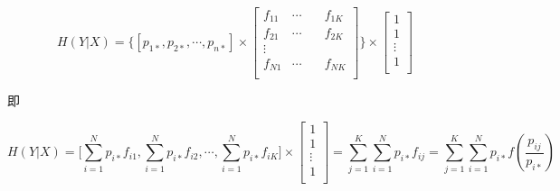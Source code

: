 \begin{remark}
    \begin{equation*}
        H(Y|X) = \Bigg\{ [p_{1*}, p_{2*},\cdots, p_{n*}] \times
        \left[
            \begin{aligned}
                f_{11} & \cdots & \quad f_{1K} \\
                f_{21} & \cdots & \quad f_{2K} \\
                \vdots                         \\
                f_{N1} & \cdots & \quad f_{NK} \\
            \end{aligned}
            \right] \Bigg\} \times
        \left[
            \begin{aligned}
                1      \\
                1      \\
                \vdots \\
                1      \\
            \end{aligned}
            \right]
    \end{equation*}

    即

    \begin{equation*}
        H(Y|X) = \Big[\sum_{i=1}^Np_{i*}f_{i1}, \sum_{i=1}^Np_{i*}f_{i2}, \cdots, \sum_{i=1}^Np_{i*}f_{iK}\Big] \times
        \left[
            \begin{aligned}
                1      \\
                1      \\
                \vdots \\
                1      \\
            \end{aligned}
            \right]
        = \sum_{j=1}^K\sum_{i=1}^Np_{i*}f_{ij} = \sum_{j=1}^K\sum_{i=1}^Np_{i*}f(\frac{p_{ij}}{p_{i*}})
    \end{equation*}

\end{remark}
